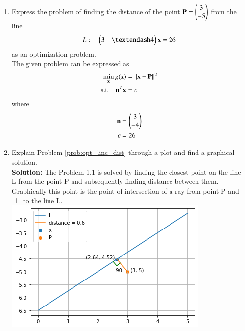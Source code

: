 \renewcommand{\theequation}{\theenumi}
\begin{enumerate}[label=\arabic*.,ref=\thesection.\theenumi]
%
%
\item Express the problem of finding the distance of the point $\mathbf{P}=\begin{pmatrix}3\\-5\end{pmatrix}$ from the line 
\label{prob:opt_line_dist}
\begin{align}
\label{eq:opt_line_nor}
L: \quad \myvec{3 & – 4}\vec{x}  = 26
\end{align}
%
as an optimization problem.
\\
\solution The given problem can be expressed as
%
\begin{align}
\label{eq:opt_line_dist}
\min_{\mathbf{x}}g(\mathbf{x}) &= \left\lVert\mathbf{x}-\mathbf{P}\right\rVert^2
\\
\text{s.t.} \quad \mathbf{n}^T\mathbf{x} &= c
\label{eq:opt_line_dist_nor}
\end{align}
%
where 
%
\begin{align}
\mathbf{n} &= \begin{pmatrix}3\\-4\end{pmatrix}
\\
c&=26
\end{align}
%
\item Explain Problem \ref{prob:opt_line_dist} through a plot and find a graphical solution.\\
%
\textbf{Solution: }
The Problem 1.1 is solved by finding the closest point on the line L from the point P and subsequently finding distance between them.\\
Graphically this point is the point of intersection of a ray from point P and $\perp$ to the line L.\\
\includegraphics[width=\columnwidth]{./figs/convex_1.2.png}


\end{enumerate}

